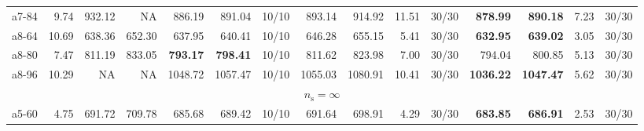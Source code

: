 \documentclass[aspectratio=1610]{beamer}
\begin{document}
\begin{frame}[noframenumbering]
\begin{table}[]
{\begin{tabular}{lrrrrrrrrrrrrrr}
a7-84                                          & 9.74                                                         & 932.12  & \multicolumn{1}{r|}{NA}       & 886.19          & 891.04                                 & \multicolumn{1}{r|}{10/10} & 893.14        & 914.92         & 11.51        & \multicolumn{1}{r|}{30/30}       & \textbf{878.99}     & {\color[HTML]{FE0000} \textbf{890.18}}    & 7.23     & 30/30   \\
a8-64                                          & 10.69                                                        & 638.36  & \multicolumn{1}{r|}{652.30}   & 637.95          & 640.41                                 & \multicolumn{1}{r|}{10/10} & 646.28        & 655.15         & 5.41         & \multicolumn{1}{r|}{30/30}       & \textbf{632.95}     & {\color[HTML]{FE0000} \textbf{639.02}}    & 3.05     & 30/30   \\
a8-80                                          & 7.47                                                         & 811.19  & \multicolumn{1}{r|}{833.05}   & \textbf{793.17} & {\color[HTML]{FE0000} \textbf{798.41}} & \multicolumn{1}{r|}{10/10} & 811.62        & 823.98         & 7.00         & \multicolumn{1}{r|}{30/30}       & 794.04              & {\color[HTML]{000000} 800.85}             & 5.13     & 30/30   \\
a8-96                                          & 10.29                                                        & NA      & \multicolumn{1}{r|}{NA}       & 1048.72         & 1057.47                                & \multicolumn{1}{r|}{10/10} & 1055.03       & 1080.91        & 10.41        & \multicolumn{1}{r|}{30/30}       & \textbf{1036.22}    & {\color[HTML]{FE0000} \textbf{1047.47}}   & 5.62     & 30/30   \\ \hline
\multicolumn{15}{c}{$n_\mathrm{s} = \infty$}                                                                                                                                                                                                                                                                                                                                                                              \\ \hline
a5-60                                          & 4.75                                                         & 691.72  & \multicolumn{1}{r|}{709.78}   & 685.68          & 689.42                                 & \multicolumn{1}{r|}{10/10} & 691.64        & 698.91         & 4.29         & \multicolumn{1}{r|}{30/30}       & \textbf{683.85}     & {\color[HTML]{FE0000} \textbf{686.91}}    & 2.53     & 30/30   \\

\end{tabular}}
\end{table}
\end{frame}
\end{document}
